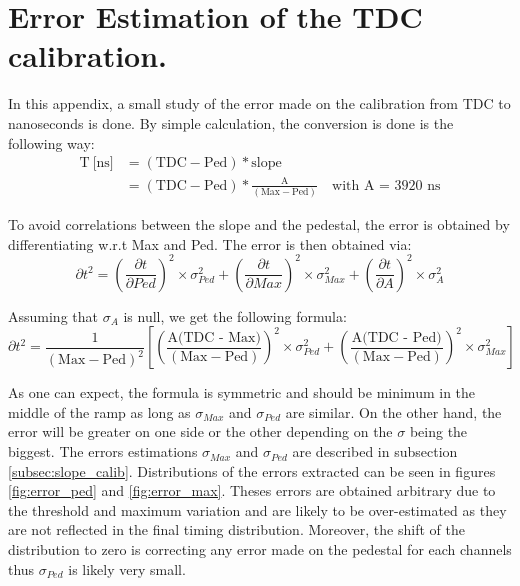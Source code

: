 \chapter{Error Estimation of the TDC calibration.}
\label{appendix:calib_error}

In this appendix, a small study of the error made on the calibration from TDC to nanoseconds is done. By simple calculation, the conversion is done is the following way:
\begin{equation*}
	\begin{split}
		\text{T} \: \text{[ns]} & = ( \text{TDC} - \text{Ped} ) * \text{slope} \\
		& = ( \text{TDC} - \text{Ped} ) * \frac{\text{A}}{(\text{Max} - \text{Ped})} \quad \text{with A = 3920 ns}
	\end{split}
\end{equation*}

To avoid correlations between the slope and the pedestal, the error is obtained by differentiating w.r.t Max and Ped. The error is then obtained via:
\begin{equation*}
	\partial t^2 = \left(\frac{\partial t}{\partial Ped}\right)^2 \times \sigma_{Ped}^2 + \left(\frac{\partial t}{\partial Max}\right)^2 \times \sigma_{Max}^2 + \left(\frac{\partial t}{\partial A}\right)^2 \times \sigma_{A}^2
\end{equation*}

Assuming that $\sigma_{A}$ is null, we get the following formula:
\begin{equation*}
	\partial t^2 = \frac{1}{(\text{Max} - \text{Ped})^2} \left[ \left( \frac{\text{A(TDC - Max)}}{(\text{Max} - \text{Ped})} \right)^2 \times \sigma_{Ped}^2 + \left( \frac{\text{A(TDC - Ped)}}{(\text{Max} - \text{Ped})} \right)^2 \times \sigma_{Max}^2 \right]
\end{equation*}

As one can expect, the formula is symmetric and should be minimum in the middle of the ramp as long as $\sigma_{Max}$ and $\sigma_{Ped}$ are similar. On the other hand, the error will be greater on one side or the other depending on the $\sigma$ being the biggest. The errors estimations $\sigma_{Max}$ and $\sigma_{Ped}$ are described in subsection \ref{subsec:slope_calib}. Distributions of the errors extracted can be seen in figures \ref{fig:error_ped} and \ref{fig:error_max}. Theses errors are obtained arbitrary due to the threshold and maximum variation and are likely to be over-estimated as they are not reflected in the final timing distribution. Moreover, the shift of the distribution to zero is correcting any error made on the pedestal for each channels thus $\sigma_{Ped}$ is likely very small.

